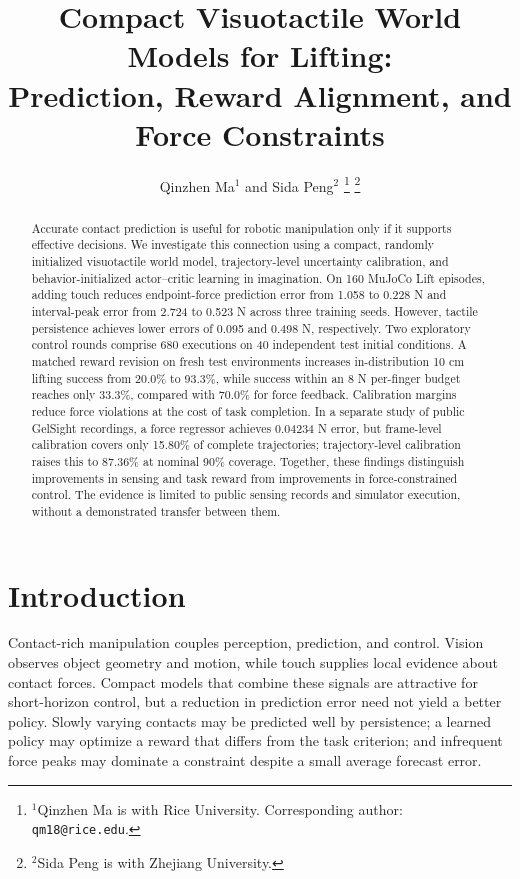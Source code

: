 \documentclass[letterpaper,10pt,conference]{ieeeconf}
\title{\LARGE\bf Compact Visuotactile World Models for Lifting:\protect\\
Prediction, Reward Alignment, and Force Constraints}
\author{Qinzhen Ma$^{1}$ and Sida Peng$^{2}$%
\thanks{$^{1}$Qinzhen Ma is with Rice University.
Corresponding author: {\tt\small qm18@rice.edu}.}%
\thanks{$^{2}$Sida Peng is with Zhejiang University.}}
\begin{document}
\maketitle
\thispagestyle{plain}
\pagestyle{plain}

\begin{abstract}
Accurate contact prediction is useful for robotic manipulation only if it supports effective decisions. We investigate this connection using a compact, randomly initialized visuotactile world model, trajectory-level uncertainty calibration, and behavior-initialized actor--critic learning in imagination. On 160 MuJoCo Lift episodes, adding touch reduces endpoint-force prediction error from 1.058 to 0.228 N and interval-peak error from 2.724 to 0.523 N across three training seeds. However, tactile persistence achieves lower errors of 0.095 and 0.498 N, respectively. Two exploratory control rounds comprise 680 executions on 40 independent test initial conditions. A matched reward revision on fresh test environments increases in-distribution 10 cm lifting success from 20.0\% to 93.3\%, while success within an 8 N per-finger budget reaches only 33.3\%, compared with 70.0\% for force feedback. Calibration margins reduce force violations at the cost of task completion. In a separate study of public GelSight recordings, a force regressor achieves 0.04234 N error, but frame-level calibration covers only 15.80\% of complete trajectories; trajectory-level calibration raises this to 87.36\% at nominal 90\% coverage. Together, these findings distinguish improvements in sensing and task reward from improvements in force-constrained control. The evidence is limited to public sensing records and simulator execution, without a demonstrated transfer between them.
\end{abstract}

\section{Introduction}

Contact-rich manipulation couples perception, prediction, and control. Vision
observes object geometry and motion, while touch supplies local evidence about
contact forces. Compact models that combine these signals are attractive for
short-horizon control, but a reduction in prediction error need not yield a
better policy. Slowly varying contacts may be predicted well by persistence;
a learned policy may optimize a reward that differs from the task criterion;
and infrequent force peaks may dominate a constraint despite a small average
forecast error.
\end{document}
